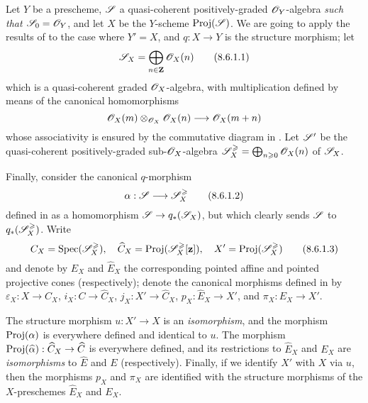 \begin{env}[8.6.1]
\label{II.8.6.1}
Let $Y$ be a prescheme, $\mathscr{S}$ a quasi-coherent positively-graded $\mathscr{O}_Y$-algebra \emph{such that $\mathscr{S}_0=\mathscr{O}_Y$}, and let $X$ be the $Y$-scheme $\operatorname{Proj}(\mathscr{S})$.
We are going to apply the results of  to the case where $Y'=X$, and $q:X\to Y$ is the structure morphism;
let
\[
\label{II.8.6.1.1}
  \mathscr{S}_X = \bigoplus_{n\in\mathbf{Z}} \mathscr{O}_X(n)
\tag{8.6.1.1}
\]
which is a quasi-coherent graded $\mathscr{O}_X$-algebra, with multiplication defined by means of the canonical homomorphisms 
\[
  \sh{O}_X(m) \otimes_{\sh{O}_X} \sh{O}_X(n)
  \to
  \sh{O}_X(m+n)
\]
whose associativity is ensured by the commutative diagram in .
Let $\mathscr{S}'$ be the quasi-coherent positively-graded sub-$\mathscr{O}_X$-algebra $\mathscr{S}_X^\geqslant = \bigoplus_{n\geqslant0}\mathscr{O}_X(n)$ of $\mathscr{S}_X$.

Finally, consider the canonical $q$-morphism
\[
\label{II.8.6.1.2}
  \alpha: \sh{S} \to \sh{S}_X^\geq
\tag{8.6.1.2}
\]
defined in  as a homomorphism $\sh{S}\to q_*(\sh{S}_X)$, but which clearly sends $\mathscr{S}$ to $q_*(\mathscr{S}_X^\geqslant)$.
Write
\[
\label{II.8.6.1.3}
  C_X = \operatorname{Spec}(\mathscr{S}_X^\geqslant),
  \quad
  \widehat{C}_X = \operatorname{Proj}(\mathscr{S}_X^\geqslant[\mathbf{z}]),
  \quad
  X' = \operatorname{Proj}(\mathscr{S}_X^\geqslant)
\tag{8.6.1.3}
\]
and denote by $E_X$ and $\widehat{E}_X$ the corresponding pointed affine and pointed projective cones (respectively);
denote the canonical morphisms defined in  by $\varepsilon_X:X\to C_X$, $i_X:C\to\widehat{C}_X$, $j_X:X'\to\widehat{C}_X$, $p_X:\widehat{E}_X\to X'$, and $\pi_X:E_X\to X'$.
\end{env}

\begin{proposition}[8.6.2]
\label{II.8.6.2}
The structure morphism $u:X'\to X$ is an \emph{isomorphism}, and the morphism $\operatorname{Proj}(\alpha)$ is everywhere defined and identical to $u$.
The morphism $\Proj(\widehat{\alpha}):\widehat{C}_X\to\widehat{C}$ is everywhere defined, and its restrictions to $\widehat{E}_X$ and $E_X$ are \emph{isomorphisms} to $\widehat{E}$ and $E$ (respectively).
Finally, if we identify $X'$ with $X$ via $u$, then the morphisms $p_X$ and $\pi_X$ are identified with the structure morphisms of the $X$-preschemes $\widehat{E}_X$ and $E_X$.
\end{proposition}

